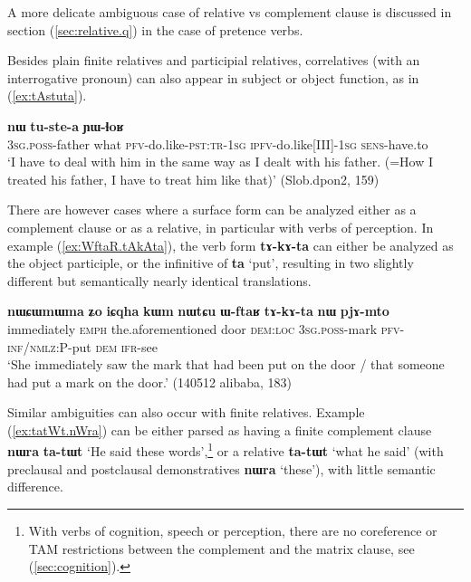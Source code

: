 \documentclass[oneside,a4paper,11pt]{article}
\newcommand{\ipa}[1]{\textbf{\phon#1}} %
\newcommand{\jpg}[2]{\ipa{#1} `#2'} %
\begin{document}
A more delicate ambiguous case of relative vs complement clause is discussed in section (\ref{sec:relative.q}) in the case of pretence verbs.

Besides plain finite relatives and participial relatives, correlatives (with an interrogative pronoun) can also appear in subject or object function, as in (\ref{ex:tAstuta}). 

\begin{exe}
\ex \label{ex:tAstuta}
\gll 
[\ipa{ɯ-wa} 	\ipa{tɕʰi} 	\ipa{tɤ-stu-t-a}] 	\ipa{nɯ} 	\ipa{tu-ste-a} 	\ipa{ɲɯ-ɬoʁ} \\
\textsc{3sg.poss-}father what \textsc{pfv}-do.like-\textsc{pst:tr}-\textsc{1sg} \textsc{ipfv}-do.like[III]-\textsc{1sg} \textsc{sens}-have.to \\
\glt `I have to deal with him in the same way as I dealt with his father. (=How I treated his father, I have to treat him like that)' (Slob.dpon2, 159)
\end{exe}

There are however cases where a surface form can be analyzed either as a complement clause or as a relative, in particular with verbs of perception. In example (\ref{ex:WftaR.tAkAta}), the verb form \ipa{tɤ-kɤ-ta} can either be analyzed as the object participle, or the infinitive of \jpg{ta}{put}, resulting in two slightly different but semantically nearly identical translations.

\begin{exe}
\ex  \label{ex:WftaR.tAkAta}
\gll 
\ipa{nɯɕɯmɯma} 	\ipa{ʑo} 	\ipa{iɕqha} 	\ipa{kɯm} 	\ipa{nɯtɕu} 	\ipa{ɯ-ftaʁ} 	\ipa{tɤ-kɤ-ta} 	\ipa{nɯ} 	\ipa{pjɤ-mto} \\
immediately \textsc{emph} the.aforementioned door \textsc{dem:loc} \textsc{3sg.poss}-mark \textsc{pfv-inf/nmlz:P}-put \textsc{dem} \textsc{ifr}-see \\
\glt `She immediately saw the mark that had been put on the door / that someone had put a mark on the door.' (140512 alibaba, 183)
\end{exe}

Similar ambiguities can also occur with finite relatives. Example (\ref{ex:tatWt.nWra}) can be either parsed as having a finite complement clause \ipa{nɯra} 	\ipa{ta-tɯt} `He said these words',\footnote{With verbs of cognition, speech or perception, there are no coreference or TAM restrictions between the complement and the matrix clause, see (\ref{sec:cognition}).} or a relative \ipa{ta-tɯt} `what he said' (with preclausal and postclausal demonstratives \ipa{nɯra} `these'), with little semantic difference.
\end{document}
